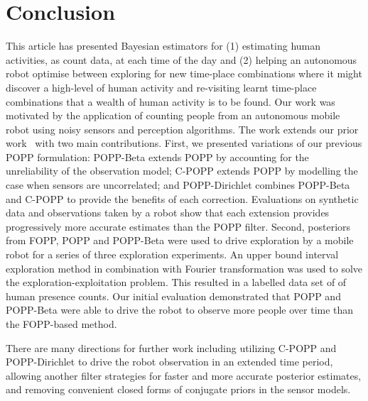 
\section{Conclusion}
\label{sec:conclusion}

This article has presented Bayesian estimators for (1) estimating human activities, as count data, at each time of the day and (2) helping an autonomous robot optimise between exploring for new time-place combinations where it might discover a high-level of human activity and re-visiting learnt time-place combinations that a wealth of human activity is to be found. Our work was motivated by the application of counting people from an autonomous mobile robot using noisy sensors and perception algorithms. The work extends our prior work~\cite{jovan18a} with two main contributions.
% 
First, we presented variations of our previous POPP formulation: POPP-Beta extends POPP by accounting for the unreliability of the observation model; C-POPP extends POPP  by modelling the case when sensors are uncorrelated; and POPP-Dirichlet combines POPP-Beta and C-POPP to provide the benefits of each correction. Evaluations on synthetic data and observations taken by a robot show that each extension provides progressively more accurate estimates than the POPP filter.  
% 
Second, posteriors from FOPP, POPP and POPP-Beta were used to drive exploration by a mobile robot for a series of three exploration experiments. An upper bound interval exploration method in combination with Fourier transformation was used to solve the exploration-exploitation problem. This resulted in a labelled data set of of human presence counts. Our initial evaluation demonstrated that POPP and POPP-Beta were able to drive the robot to observe more people over time than the FOPP-based method. 

There are many directions for further work including utilizing C-POPP and POPP-Dirichlet to drive the robot observation in an extended time period, allowing another filter strategies for faster and more accurate posterior estimates, and removing convenient closed forms of conjugate priors in the sensor models.
        

